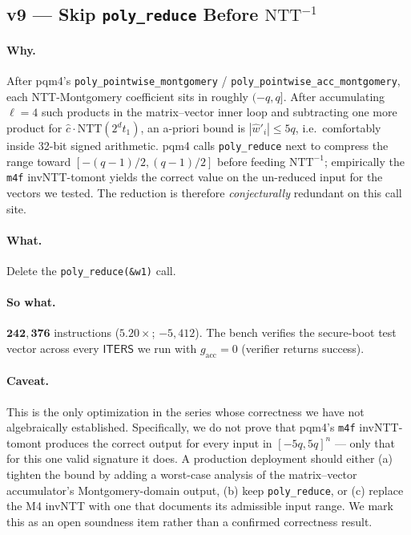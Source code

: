 \documentclass[11pt,a4paper]{article}
\newcommand{\NTT}{\mathrm{NTT}}
\newcommand{\iNTT}{\mathrm{NTT}^{-1}}
\begin{document}
\subsection{v9 --- Skip \texttt{poly\_reduce} Before \texorpdfstring{$\iNTT$}{invNTT}}

\paragraph{Why.} After pqm4's \texttt{poly\_pointwise\_montgomery} /
\texttt{poly\_pointwise\_acc\_montgomery}, each NTT-Montgomery
coefficient sits in roughly $(-q, q]$. After accumulating $\ell = 4$
such products in the matrix--vector inner loop and subtracting one
more product for $\hat c \cdot \NTT(2^d t_1)$, an a-priori bound is
$|\hat{w}'_i| \le 5q$, i.e.\ comfortably inside 32-bit signed
arithmetic. pqm4 calls \texttt{poly\_reduce} next to compress the range
toward $[-(q-1)/2,(q-1)/2]$ before feeding $\iNTT$; empirically the
\texttt{m4f} invNTT-tomont yields the correct value on the un-reduced
input for the vectors we tested. The reduction is therefore
\emph{conjecturally} redundant on this call site.

\paragraph{What.} Delete the \texttt{poly\_reduce(\&w1)} call.

\paragraph{So what.} $\mathbf{242{,}376}$ instructions
($\mathbf{5.20\times}$; $-5{,}412$). The bench verifies the
secure-boot test vector across every $\textsf{ITERS}$ we run with
$g_{\mathrm{acc}} = 0$ (verifier returns success).

\paragraph{Caveat.} This is the only optimization in the series whose
correctness we have not algebraically established. Specifically, we
do not prove that pqm4's \texttt{m4f} invNTT-tomont produces the
correct output for every input in $[-5q, 5q]^{n}$ --- only that for
this one valid signature it does. A production deployment should
either (a) tighten the bound by adding a worst-case analysis of the
matrix--vector accumulator's Montgomery-domain output, (b) keep
\texttt{poly\_reduce}, or (c) replace the M4 invNTT with one that
documents its admissible input range. We mark this as an open
soundness item rather than a confirmed correctness result.
\end{document}
